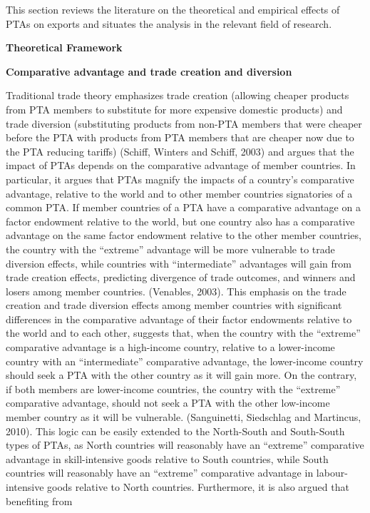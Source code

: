 This section reviews the literature on the theoretical and empirical
effects of PTAs on exports and situates the analysis in the relevant
field of research.

\textbf{Theoretical Framework}

\textbf{Comparative advantage and trade creation and diversion}

Traditional trade theory emphasizes trade creation (allowing cheaper
products from PTA members to substitute for more expensive domestic
products) and trade diversion (substituting products from non-PTA
members that were cheaper before the PTA with products from PTA members
that are cheaper now due to the PTA reducing tariffs) (Schiff, Winters
and Schiff, 2003) and argues that the impact of PTAs depends on the
comparative advantage of member countries. In particular, it argues that
PTAs magnify the impacts of a country's comparative advantage, relative
to the world and to other member countries signatories of a common PTA.
If member countries of a PTA have a comparative advantage on a factor
endowment relative to the world, but one country also has a comparative
advantage on the same factor endowment relative to the other member
countries, the country with the ``extreme'' advantage will be more
vulnerable to trade diversion effects, while countries with
``intermediate'' advantages will gain from trade creation effects,
predicting divergence of trade outcomes, and winners and losers among
member countries. (Venables, 2003). This emphasis on the trade creation
and trade diversion effects among member countries with significant
differences in the comparative advantage of their factor endowments
relative to the world and to each other, suggests that, when the country
with the ``extreme'' comparative advantage is a high-income country,
relative to a lower-income country with an ``intermediate'' comparative
advantage, the lower-income country should seek a PTA with the other
country as it will gain more. On the contrary, if both members are
lower-income countries, the country with the ``extreme'' comparative
advantage, should not seek a PTA with the other low-income member
country as it will be vulnerable. (Sanguinetti, Siedschlag and
Martincus, 2010). This logic can be easily extended to the North-South
and South-South types of PTAs, as North countries will reasonably have
an ``extreme'' comparative advantage in skill-intensive goods relative
to South countries, while South countries will reasonably have an
``extreme'' comparative advantage in labour-intensive goods relative to
North countries. Furthermore, it is also argued that benefiting from
